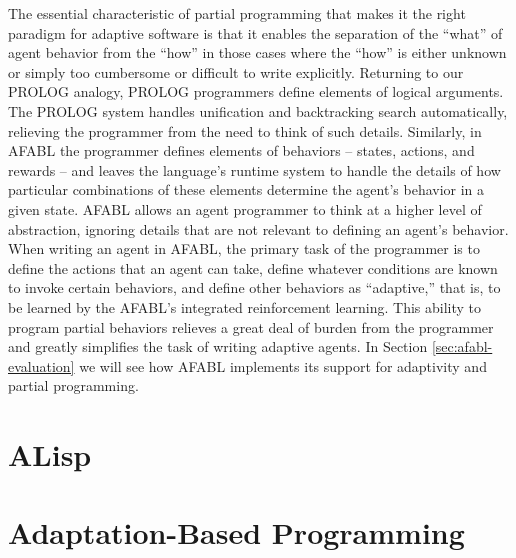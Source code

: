 The essential characteristic of partial programming that makes it the right paradigm for adaptive software is that it enables the separation of the ``what'' of agent behavior from the ``how'' in those cases where the ``how'' is either unknown or simply too cumbersome or difficult to write explicitly.  Returning to our PROLOG analogy, PROLOG programmers define elements of logical arguments.  The PROLOG system handles unification and backtracking search automatically, relieving the programmer from the need to think of such details. Similarly, in AFABL the programmer defines elements of behaviors -- states, actions, and rewards -- and leaves the language's runtime system to handle the details of how particular combinations of these elements determine the agent's behavior in a given state.  AFABL allows an agent programmer to think at a higher level of abstraction, ignoring details that are not relevant to defining an agent's behavior.  When writing an agent in AFABL, the primary task of the programmer is to define the actions that an agent can take, define whatever conditions are known to invoke certain behaviors, and define other behaviors as ``adaptive,'' that is, to be learned by the AFABL's integrated reinforcement learning.  This ability to program partial behaviors relieves a great deal of burden from the programmer and greatly simplifies the task of writing adaptive agents.  In Section \ref{sec:afabl-evaluation} we will see how AFABL implements its support for adaptivity and partial programming.


\section{ALisp}

\section{Adaptation-Based Programming}
